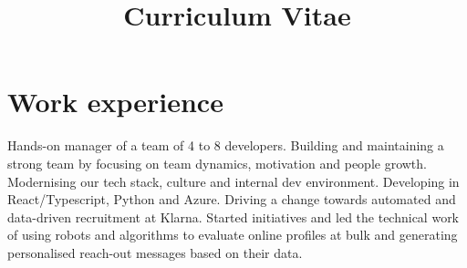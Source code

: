 \documentclass[11pt,a4paper,sans]{moderncv}
\title{Curriculum Vitae}
\begin{document}
\makecvtitle

\section{Work experience}
{Hands-on manager of a team of 4 to 8 developers.
Building and maintaining a strong team by focusing on team dynamics, motivation and people growth.
Modernising our tech stack, culture and internal dev environment.
Developing in React/Typescript, Python and Azure.}
{Driving a change towards automated and data-driven recruitment at Klarna.
Started initiatives and led the technical work of using robots and algorithms to evaluate
online profiles at bulk and generating personalised reach-out messages based on their data.
}
{}
\end{document}
